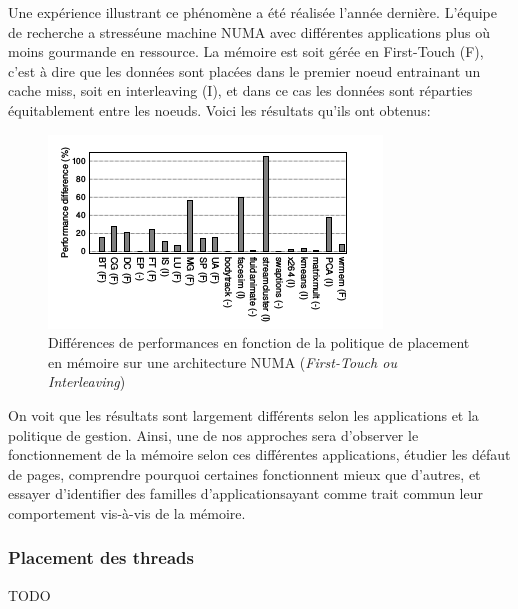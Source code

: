    Une expérience illustrant ce phénomène a été réalisée l'année
    dernière\cite{Holistic2013}. L'équipe de recherche a \og stressé\fg une
    machine NUMA avec différentes applications plus où moins gourmande en
    ressource. La mémoire est soit gérée en \og First-Touch (F)\fg, c'est à dire
    que les données sont placées dans le premier noeud entrainant un cache miss,
    soit en \og interleaving (I)\fg, et dans ce cas les données sont réparties
    équitablement entre les noeuds. Voici les résultats qu'ils ont obtenus:

    \begin{figure}[H]
      \includegraphics[scale=0.65]{img/numa_memory_policy}
      \caption{Différences de performances en fonction de la politique de
        placement en mémoire sur une architecture NUMA (\textit{First-Touch ou Interleaving})}
    \end{figure}

    On voit que les résultats sont largement différents selon les applications
    et la politique de gestion. Ainsi, une de nos approches sera d'observer le
    fonctionnement de la mémoire selon ces différentes applications, étudier les
    défaut de pages, comprendre pourquoi certaines fonctionnent mieux que
    d'autres, et essayer d'identifier des \og familles d'applications\fg ayant
    comme trait commun leur comportement vis-à-vis de la mémoire.
    
  \subsubsection{Placement des threads}
  
    TODO
